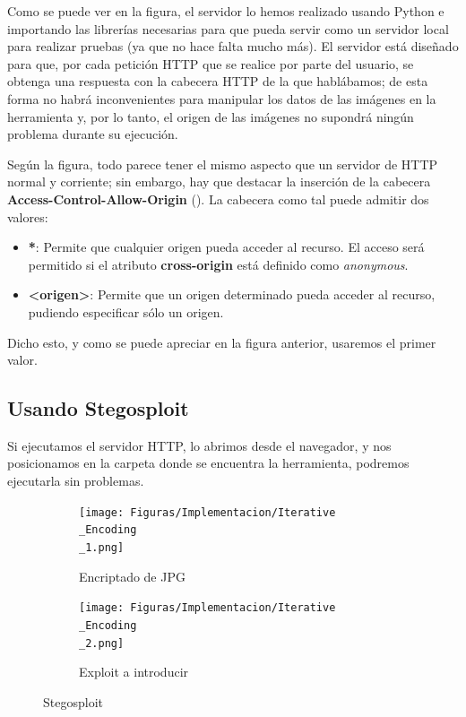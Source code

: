 Como se puede ver en la figura, el servidor lo hemos realizado usando Python e importando las librerías necesarias para que pueda servir como un servidor local para realizar pruebas (ya que no hace falta mucho más). El servidor está diseñado para que, por cada petición HTTP que se realice por parte del usuario, se obtenga una respuesta con la cabecera HTTP de la que hablábamos; de esta forma no habrá inconvenientes para manipular los datos de las imágenes en la herramienta y, por lo tanto, el origen de las imágenes no supondrá ningún problema durante su ejecución.

Según la figura, todo parece tener el mismo aspecto que un servidor de HTTP normal y corriente; sin embargo, hay que destacar la inserción de la cabecera \textbf{Access-Control-Allow-Origin} (\cite{server-http}). La cabecera como tal puede admitir dos valores:

\begin{itemize}
\item \textbf{*}: Permite que cualquier origen pueda acceder al recurso. El acceso será permitido si el atributo \textbf{cross-origin} está definido como \textit{anonymous}.
\item \textbf{<origen>}: Permite que un origen determinado pueda acceder al recurso, pudiendo especificar sólo un origen.
\end{itemize}

Dicho esto, y como se puede apreciar en la figura anterior, usaremos el primer valor.

\subsection{Usando Stegosploit}

Si ejecutamos el servidor HTTP, lo abrimos desde el navegador, y nos posicionamos en la carpeta donde se encuentra la herramienta, podremos ejecutarla sin problemas.

\begin{figure}[H]
  \centering
  \begin{subfigure}[H]{0.30\linewidth}
  	\texttt{[image: Figuras/Implementacion/Iterative\\\_Encoding\\\_1.png]}
  	\label{fig:iter-encod}
  	\caption{Encriptado de JPG}
  \end{subfigure}
  \begin{subfigure}[H]{0.45\linewidth}
  	\texttt{[image: Figuras/Implementacion/Iterative\\\_Encoding\\\_2.png]}
  	\label{fig:iter-encod-2}
  	\caption{Exploit a introducir}
  \end{subfigure}
  \caption{Stegosploit}
\end{figure}

